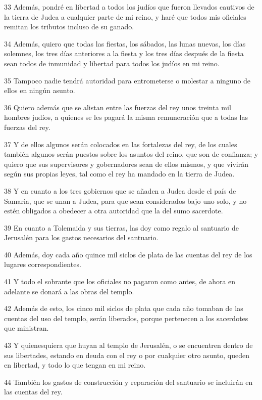 \par 33 Además, pondré en libertad a todos los judíos que fueron llevados cautivos de la tierra de Judea a cualquier parte de mi reino, y haré que todos mis oficiales remitan los tributos incluso de su ganado.
\par 34 Además, quiero que todas las fiestas, los sábados, las lunas nuevas, los días solemnes, los tres días anteriores a la fiesta y los tres días después de la fiesta sean todos de inmunidad y libertad para todos los judíos en mi reino.
\par 35 Tampoco nadie tendrá autoridad para entrometerse o molestar a ninguno de ellos en ningún asunto.
\par 36 Quiero además que se alistan entre las fuerzas del rey unos treinta mil hombres judíos, a quienes se les pagará la misma remuneración que a todas las fuerzas del rey.
\par 37 Y de ellos algunos serán colocados en las fortalezas del rey, de los cuales también algunos serán puestos sobre los asuntos del reino, que son de confianza; y quiero que sus supervisores y gobernadores sean de ellos mismos, y que vivirán según sus propias leyes, tal como el rey ha mandado en la tierra de Judea.
\par 38 Y en cuanto a los tres gobiernos que se añaden a Judea desde el país de Samaria, que se unan a Judea, para que sean considerados bajo uno solo, y no estén obligados a obedecer a otra autoridad que la del sumo sacerdote.
\par 39 En cuanto a Tolemaida y sus tierras, las doy como regalo al santuario de Jerusalén para los gastos necesarios del santuario.
\par 40 Además, doy cada año quince mil siclos de plata de las cuentas del rey de los lugares correspondientes.
\par 41 Y todo el sobrante que los oficiales no pagaron como antes, de ahora en adelante se donará a las obras del templo.
\par 42 Además de esto, los cinco mil siclos de plata que cada año tomaban de las cuentas del uso del templo, serán liberados, porque pertenecen a los sacerdotes que ministran.
\par 43 Y quienesquiera que huyan al templo de Jerusalén, o se encuentren dentro de sus libertades, estando en deuda con el rey o por cualquier otro asunto, queden en libertad, y todo lo que tengan en mi reino.
\par 44 También los gastos de construcción y reparación del santuario se incluirán en las cuentas del rey.
